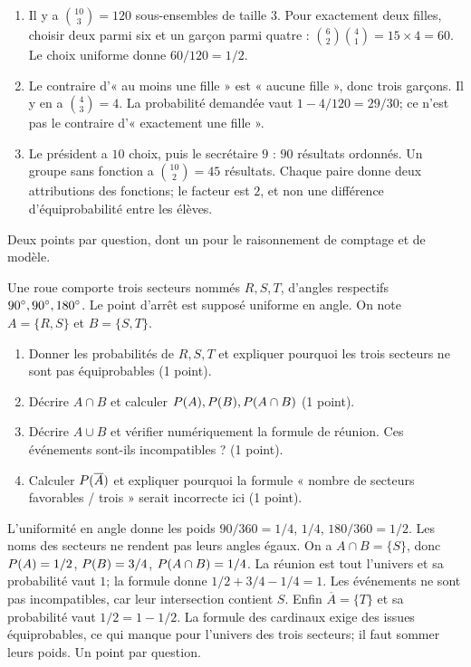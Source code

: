 \begin{corrige}\label{sol-t11s-ds4-e03}
\begin{enumerate}
\item Il y a $\binom{10}3=120$ sous-ensembles de taille $3$. Pour exactement deux filles, choisir deux parmi six et un garçon parmi quatre : $\binom62\binom41=15\times4=60$. Le choix uniforme donne $60/120=1/2$.
\item Le contraire d’« au moins une fille » est « aucune fille », donc trois garçons. Il y en a $\binom43=4$. La probabilité demandée vaut $1-4/120=29/30$; ce n’est pas le contraire d’« exactement une fille ».
\item Le président a $10$ choix, puis le secrétaire $9$ : $90$ résultats ordonnés. Un groupe sans fonction a $\binom{10}2=45$ résultats. Chaque paire donne deux attributions des fonctions; le facteur est $2$, et non une différence d’équiprobabilité entre les élèves.
\end{enumerate}
Deux points par question, dont un pour le raisonnement de comptage et de modèle.
\end{corrige}
\label{t11s-ds4-e04}\par
Une roue comporte trois secteurs nommés $R,S,T$, d’angles respectifs $90^{\circ},90^{\circ},180^{\circ}$. Le point d’arrêt est supposé uniforme en angle. On note $A=\{R,S\}$ et $B=\{S,T\}$.
\begin{enumerate}
\item Donner les probabilités de $R,S,T$ et expliquer pourquoi les trois secteurs ne sont pas équiprobables (1 point).
\item Décrire $A\cap B$ et calculer $P(A),P(B),P(A\cap B)$ (1 point).
\item Décrire $A\cup B$ et vérifier numériquement la formule de réunion. Ces événements sont-ils incompatibles ? (1 point).
\item Calculer $P(\overline A)$ et expliquer pourquoi la formule « nombre de secteurs favorables / trois » serait incorrecte ici (1 point).
\end{enumerate}
\begin{corrige}\label{sol-t11s-ds4-e04}
L’uniformité en angle donne les poids $90/360=1/4$, $1/4$, $180/360=1/2$. Les noms des secteurs ne rendent pas leurs angles égaux. On a $A\cap B=\{S\}$, donc $P(A)=1/2$, $P(B)=3/4$, $P(A\cap B)=1/4$. La réunion est tout l’univers et sa probabilité vaut $1$; la formule donne $1/2+3/4-1/4=1$. Les événements ne sont pas incompatibles, car leur intersection contient $S$. Enfin $\overline A=\{T\}$ et sa probabilité vaut $1/2=1-1/2$. La formule des cardinaux exige des issues équiprobables, ce qui manque pour l’univers des trois secteurs; il faut sommer leurs poids. Un point par question.
\end{corrige}
\endgroup
